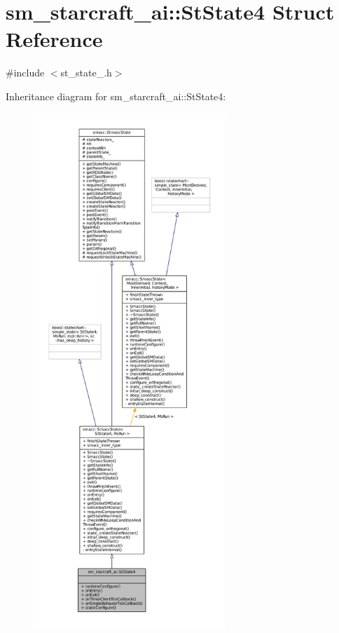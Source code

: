 \hypertarget{structsm__starcraft__ai_1_1StState4}{}\section{sm\+\_\+starcraft\+\_\+ai\+:\+:St\+State4 Struct Reference}
\label{structsm__starcraft__ai_1_1StState4}


{\ttfamily \#include $<$st\+\_\+state\+\_.\+h$>$}



Inheritance diagram for sm\+\_\+starcraft\+\_\+ai\+:\+:St\+State4\+:
\nopagebreak
\begin{figure}[H]
\begin{center}
\leavevmode
\includegraphics[height=550pt]{structsm__starcraft__ai_1_1StState4__inherit__graph}
\end{center}
\end{figure}


